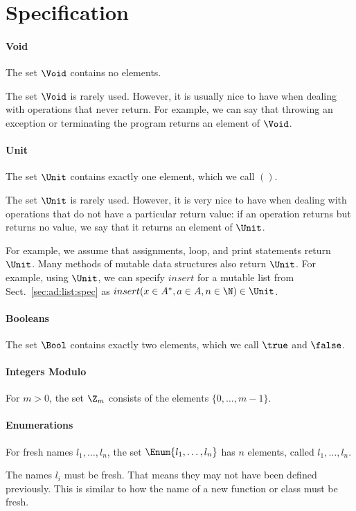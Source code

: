 \section{Specification}

\paragraph{Void}
The set $\Void$ contains no elements.

The set $\Void$ is rarely used.
However, it is usually nice to have when dealing with operations that never return.
For example, we can say that throwing an exception or terminating the program returns an element of $\Void$.

\paragraph{Unit}
The set $\Unit$ contains exactly one element, which we call $()$.

The set $\Unit$ is rarely used.
However, it is very nice to have when dealing with operations that do not have a particular return value: if an operation returns but returns no value, we say that it returns an element of $\Unit$.

For example, we assume that assignments, loop, and print statements return $\Unit$.
Many methods of mutable data structures also return $\Unit$.
For example, using $\Unit$, we can specify $insert$ for a mutable list from Sect.~\ref{sec:ad:list:spec} as $insert(x\in A^*,a\in A,n\in\N)\in\Unit$.

\paragraph{Booleans}
The set $\Bool$ contains exactly two elements, which we call $\true$ and $\false$.

\paragraph{Integers Modulo}
For $m>0$, the set $\Z_m$ consists of the elements $\{0,\ldots,m-1\}$.

\paragraph{Enumerations}
For fresh names $l_1,\ldots,l_n$, the set $\Enum\{l_1,\ldots,l_n\}$ has $n$ elements, called $l_1,\ldots,l_n$.

The names $l_i$ must be fresh.
That means they may not have been defined previously.
This is similar to how the name of a new function or class must be fresh.

